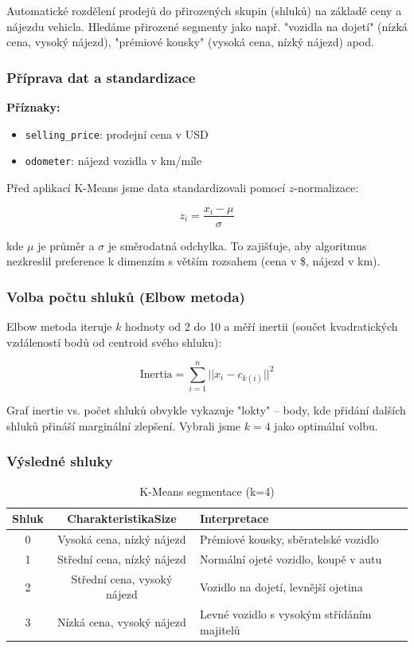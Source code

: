 \documentclass[12pt,a4paper]{article}
\begin{document}
Automatické rozdělení prodejů do přirozených skupin (shluků) na základě ceny a nájezdu vehicla.
Hledáme přirozené segmenty jako např. "vozidla na dojetí" (nízká cena, vysoký nájezd),
"prémiové kousky" (vysoká cena, nízký nájezd) apod.

\subsubsection{Příprava dat a standardizace}

\textbf{Příznaky:}
\begin{itemize}
    \item \texttt{selling\_price}: prodejní cena v USD
    \item \texttt{odometer}: nájezd vozidla v km/míle
\end{itemize}

Před aplikací K-Means jsme data standardizovali pomocí $z$-normalizace:

$$z_i = \frac{x_i - \mu}{\sigma}$$

kde $\mu$ je průměr a $\sigma$ je směrodatná odchylka. To zajišťuje, aby algoritmus
nezkreslil preference k dimenzím s větším rozsahem (cena v \$, nájezd v km).

\subsubsection{Volba počtu shluků (Elbow metoda)}

Elbow metoda iteruje $k$ hodnoty od 2 do 10 a měří inertii (součet kvadratických
vzdáleností bodů od centroid svého shluku):

$$\text{Inertia} = \sum_{i=1}^{n} ||x_i - c_{k(i)}||^2$$

Graf inertie vs. počet shluků obvykle vykazuje "lokty" – body, kde přidání dalších shluků
přináší marginální zlepšení. Vybrali jsme $k = 4$ jako optimální volbu.

\subsubsection{Výsledné shluky}

\begin{table}[H]
    \centering
    \caption{K-Means segmentace (k=4)}
    \begin{tabularx}{\textwidth}{|c|c|X|}
        \hline
        \textbf{Shluk} & \textbf{CharakteristikaSize} & \textbf{Interpretace} \\
        \hline
        0 & Vysoká cena, nízký nájezd & Prémiové kousky, sběratelské vozidlo \\
        \hline
        1 & Střední cena, nízký nájezd & Normální ojeté vozidlo, koupě v autu \\
        \hline
        2 & Střední cena, vysoký nájezd & Vozidlo na dojetí, levnější ojetina \\
        \hline
        3 & Nízká cena, vysoký nájezd & Levné vozidlo s vysokým střídáním majitelů \\
        \hline
    \end{tabularx}
\end{table}
\end{document}
